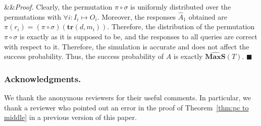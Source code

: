 \documentclass[11pt]{article}
\renewenvironment{proof}[1][]
    {\noindent
       \ifx&#1&{\it Proof.}
       \else{\it Proof ({#1}).}
       \fi}{\hfill $\blacksquare$}
\newcommand{\secv}{{d}}
\newcommand{\TR}{\boldsymbol{tr}}
\newcommand{\INP}{I}
\newcommand{\OUTP}{O}
\newcommand{\MAXS}{\boldsymbol{MaxS}}
\begin{document}
\begin{proof}
Clearly, the permutation $\pi \circ \sigma$ is uniformly distributed over the permutations with $\forall i:\INP_i \mapsto \OUTP_i$. Moreover, the responses $\widehat{A}_1$ obtained are $\pi(r_i) = (\pi \circ \sigma)(\TR(\secv,m_i))$. Therefore, the distribution of the permutation $\pi \circ \sigma$ is exactly as it is supposed to be, and the responses to all queries are correct with respect to it. Therefore, the simulation is accurate and does not affect the success probability. Thus, the success probability of $A$ is exactly $\widehat{\MAXS}(T)$.
\end{proof}

\subsubsection*{Acknowledgments.} We thank the anonymous reviewers for their useful comments. In particular, we thank a reviewer who pointed out an error in the proof of Theorem~\ref{thm:pc to middle} in a previous version of this paper.  

	
	
\end{document}
